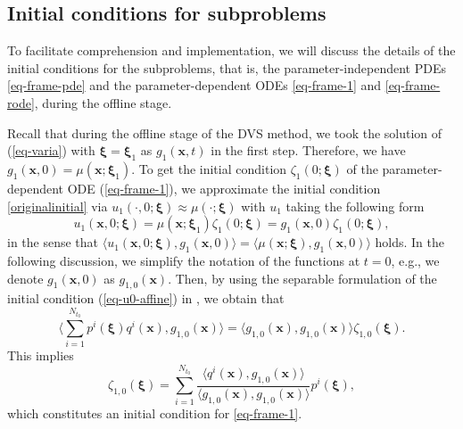 \documentclass[10pt,a4paper]{article}
\numberwithin{equation}{section}
\numberwithin{lemma}{section}
\numberwithin{example}{section}
\numberwithin{definition}{section}
\numberwithin{assumption}{section}
\numberwithin{theorem}{section}
\numberwithin{proposition}{section}
\numberwithin{corollary}{section}
\numberwithin{remark}{section}
\begin{document}
\subsection{Initial conditions for subproblems}
To facilitate comprehension and implementation, we will discuss the details of the initial conditions for the subproblems, that is, the parameter-independent PDEs \eqref{eq-frame-pde} and the parameter-dependent ODEs \eqref{eq-frame-1} and \eqref{eq-frame-rode}, during the offline stage.

Recall that during the offline stage of the DVS method, we took the solution of (\ref{eq-varia}) with $\bm{\xi}=\bm{\xi}_1$ as $g_1(\bm{x},t)$ in the first step.
Therefore, we have $g_1(\bm{x},0)=\mu(\bm{x};\bm{\xi}_1)$.
To get the initial condition $\zeta_1(0;\bm{\xi})$ of the parameter-dependent ODE (\ref{eq-frame-1}), we approximate the initial condition \eqref{originalinitial} via $u_1(\cdot,0;\bm{\xi})\approx \mu (\cdot;\bm{\xi})$
with $u_1$ taking the following form
$$
u_1(\bm{x},0; \bm{\xi})
=\mu(\bm{x};\bm{\xi}_1)\zeta_1(0;\bm{\xi})=g_1(\bm{x},0)\zeta_1(0;\bm{\xi}),
$$
in the sense that 
$\langle u_1(\bm{x},0;\bm{\xi}), g_{1}(\bm{x},0)\rangle
=\langle \mu(\bm{x}; \bm{\xi}), g_{1}(\bm{x},0)\rangle$ holds. 
In the following discussion, we simplify the notation of the functions at $t=0$, e.g., we denote $g_1(\bm{x},0)$ as $g_{1,0}(\bm{x})$. 
Then, by using the separable formulation of the initial condition (\ref{eq-u0-affine}) in , 
we obtain that  
$$
\Big\langle \sum_{i=1}^{N_{t_0}}p^i(\bm{\xi})q^i(\bm{x}),g_{1,0}(\bm{x}) \Big\rangle = \big \langle g_{1,0}(\bm{x}),g_{1,0}(\bm{x}) \big \rangle\zeta_{1,0}(\bm{\xi}).
$$
This implies 
\begin{equation}
\label{initialconditionfirst}
\zeta_{1,0}(\bm{\xi})=\sum_{i=1}^{N_{t_0}}  \frac{\langle q^i(\bm{x}),g_{1,0}(\bm{x}) \rangle}{\langle g_{1,0}(\bm{x}),g_{1,0}(\bm{x}) \rangle}p^i(\bm{\xi}),
\end{equation}
which constitutes an initial condition for \eqref{eq-frame-1}.
\end{document}
